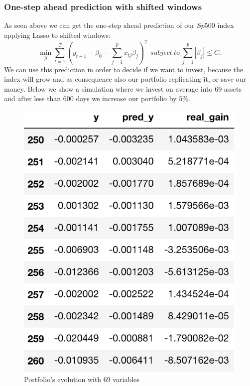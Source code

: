 \documentclass{article}%
\begin{document}
\subsubsection{One-step ahead prediction with shifted windows}
As seen above we can get the one-step ahead prediction of our $Sp500$ index applying Lasso to shifted windows:
\begin{equation}
 \min_{\beta} \sum_{t=1}^T ( y_{t+1} -\beta_0 -\sum_{j=1}^p x_{tj} \beta_j)^2 ~~subject~to~\sum_{j=1}^p |\beta_j| \leq C.
\end{equation}
We can use this prediction in order to decide if we want to invest, because the index will grow and as consequence also our portfolio replicating it, or save our money. Below we show a simulation where we invest on average into 69 assets and after 
less than 600 days we increase our portfolio by $5\%$. 
\newpage
  \begin{figure}[h!!!!!]
  \centering
  \includegraphics[scale=0.6]{act_port.png}
  \caption{Portfolio's evolution with 69 variables}
  \label{portfolio_alpha}
  \end{figure}
  
\end{document}
